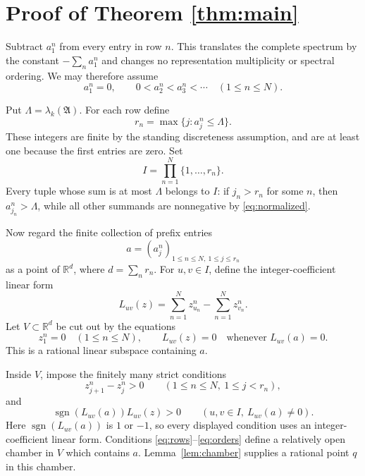 \documentclass[11pt]{article}
\newcommand{\R}{\mathbb R}
\newcommand{\Acal}{\mathfrak A}
\begin{document}
\section*{Proof of Theorem \ref{thm:main}}

Subtract $a_1^n$ from every entry in row $n$.  This translates the complete
spectrum by the constant $-\sum_na_1^n$ and changes no representation
multiplicity or spectral ordering.  We may therefore assume
\begin{equation}\label{eq:normalized}
                    a_1^n=0,\qquad 0<a_2^n<a_3^n<\cdots
                    \quad(1\leq n\leq N).
\end{equation}

Put $\Lambda=\lambda_k(\Acal)$.  For each row define
\[
                 r_n=\max\{j:a_j^n\leq\Lambda\}.
\]
These integers are finite by the standing discreteness assumption, and are
at least one because the first entries are zero.  Set
\[
                      I=\prod_{n=1}^N\{1,\ldots,r_n\}.
\]
Every tuple whose sum is at most $\Lambda$ belongs to $I$: if
$j_n>r_n$ for some $n$, then $a_{j_n}^n>\Lambda$, while all other summands
are nonnegative by \eqref{eq:normalized}.

Now regard the finite collection of prefix entries
\[
                   a=(a_j^n)_{1\leq n\leq N,\ 1\leq j\leq r_n}
\]
as a point of $\R^d$, where $d=\sum_nr_n$.  For $u,v\in I$, define the
integer-coefficient linear form
\[
 L_{uv}(z)=\sum_{n=1}^Nz_{u_n}^n-\sum_{n=1}^Nz_{v_n}^n.
\]
Let $V\subset\R^d$ be cut out by the equations
\begin{equation}\label{eq:V}
 z_1^n=0\quad(1\leq n\leq N),
 \qquad
 L_{uv}(z)=0\quad\text{whenever }L_{uv}(a)=0.
\end{equation}
This is a rational linear subspace containing $a$.

Inside $V$, impose the finitely many strict conditions
\begin{equation}\label{eq:rows}
 z_{j+1}^n-z_j^n>0
 \qquad(1\leq n\leq N,\ 1\leq j<r_n),
\end{equation}
and
\begin{equation}\label{eq:orders}
 \operatorname{sgn}(L_{uv}(a))L_{uv}(z)>0
 \qquad(u,v\in I,\ L_{uv}(a)\neq0).
\end{equation}
Here $\operatorname{sgn}(L_{uv}(a))$ is $1$ or $-1$, so every displayed
condition uses an integer-coefficient linear form.  Conditions
\eqref{eq:rows}--\eqref{eq:orders} define a relatively open chamber in $V$
which contains $a$.  Lemma~\ref{lem:chamber} supplies a rational point
$q$ in this chamber.
\end{document}
